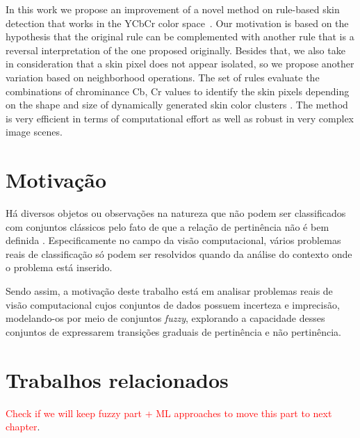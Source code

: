 In this work we propose an improvement of a novel method on rule-based skin detection that works in the YCbCr color space~\citep{brancati:17}. Our motivation is based on the hypothesis that the original rule can be complemented with another rule that is a reversal interpretation of the one proposed originally. Besides that, we also take in consideration that a skin pixel does not appear isolated, so we propose another variation based on neighborhood operations. The set of rules evaluate the combinations of chrominance Cb, Cr values to identify the skin pixels depending on the shape and size of dynamically generated skin color clusters \citep{brancati:17}. The method is very efficient in terms of computational effort as well as robust in very complex image scenes.

\section{Motivação}
\label{sec:consideracoes_preliminares}

Há diversos objetos ou observações na natureza que não podem ser classificados com conjuntos clássicos pelo fato de que a relação de pertinência não é bem definida \citep{pedrycz:98}. Especificamente no campo da visão computacional, vários problemas reais de classificação só podem ser resolvidos quando da análise do contexto onde o problema está inserido.

Sendo assim, a motivação deste trabalho está em analisar problemas reais de visão computacional cujos conjuntos de dados possuem incerteza e imprecisão, modelando-os por meio de conjuntos \emph{fuzzy}, explorando a capacidade desses conjuntos de expressarem transições graduais de pertinência e não pertinência.


\section{Trabalhos relacionados}
\label{sec:trabalhos_relacionados}

\textcolor{red}{Check if we will keep fuzzy part + ML approaches to move this part to next chapter}.


